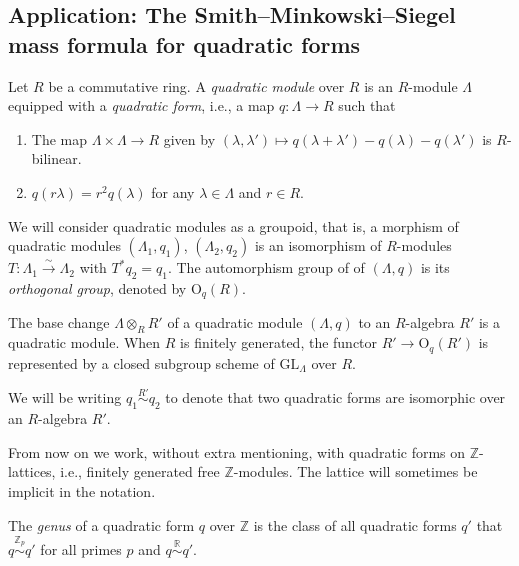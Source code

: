 \subsection{Application: The Smith--Minkowski--Siegel mass formula for quadratic forms}
\label{subsection-mass-formula}

\begin{definition}
\label{definition-quadratic-module}
    Let $R$ be a commutative ring. A {\it quadratic module} over $R$ is an $R$-module $\Lambda$ equipped with a {\it quadratic form}, i.e., a map $q: \Lambda\rightarrow R$  such that 
    \begin{enumerate}
    \item The map $ \Lambda\times \Lambda \rightarrow  R$ given by $(\lambda,\lambda')\mapsto q(\lambda+\lambda')-q(\lambda)-q(\lambda')$ is $R$-bilinear. 
    \item $q(r\lambda)=r^2q(\lambda)$ for any $\lambda\in \Lambda$ and $r\in R$.
    \end{enumerate}
    We will consider quadratic modules as a groupoid, that is, a morphism of quadratic modules $(\Lambda_1, q_1)$, $(\Lambda_2,q_2)$ is an isomorphism of $R$-modules $T:\Lambda_1\xrightarrow\sim \Lambda_2$ with $T^*q_2 = q_1$. The automorphism group of of $(\Lambda, q)$ is its {\it orthogonal group}, denoted by $\text{O}_q(R)$. 
\end{definition}

\begin{remark}
\label{remark-orthogonal-group}
 The base change $\Lambda \otimes_R R'$ of a quadratic module $(\Lambda, q)$ to an $R$-algebra $R'$ is a quadratic module. When $R$ is finitely generated, the functor $R'\to \text{O}_q(R')$ is represented by a closed subgroup scheme of $\text{GL}_\Lambda$ over $R$.

  We will be writing $q_1 \overset{R'}\sim q_2$ to denote that two quadratic forms are isomorphic over an $R$-algebra $R'$.
\end{remark}

From now on we work, without extra mentioning, with quadratic forms on $\mathbb Z$-lattices, i.e., finitely generated free $\mathbb Z$-modules. The lattice will sometimes be implicit in the notation.

\begin{definition}
\label{definition-genus}
	The \textit{genus} of a quadratic form  $q$ over $\mathbb Z$ is the class of all quadratic forms $q'$ that $q\overset{\mathbb{Z}_p}{\sim} q'$ for all primes $p$ and $q\overset{\mathbb{R}}{\sim} q'$. 
\end{definition}

